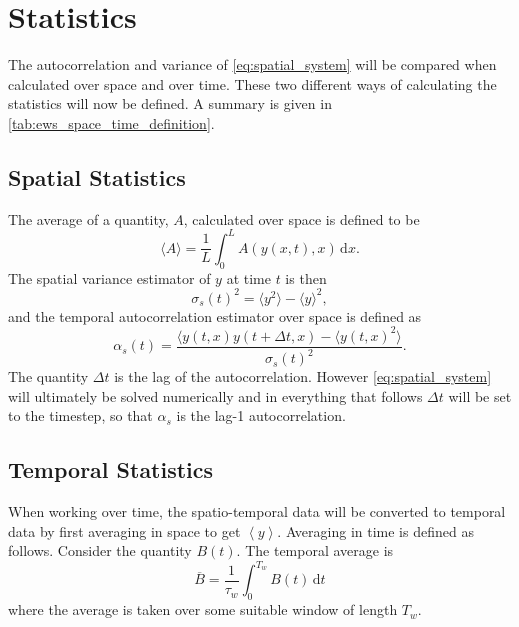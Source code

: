 \section{Statistics}
The autocorrelation and variance of \cref{eq:spatial_system} will be compared when calculated over space and over time. These two different ways of calculating the statistics  will now
be defined. A summary is given in \cref{tab:ews_space_time_definition}.

\subsection{Spatial Statistics}

The average of a quantity, $A$, calculated over space is defined to be
\begin{equation}
  \label{eq:definition_of_average}
  \langle A \rangle = \frac{1}{L}\int_0^L A(y(x,t),x) \,\mathrm{d}x.
\end{equation}
The spatial variance estimator of $y$ at time $t$ is then
\begin{equation}
  \label{eq:spatial_variance}
  \sigma_s(t)^2 = \langle y^2 \rangle - \langle y \rangle^2,
\end{equation}
and the temporal autocorrelation estimator over space is defined as
\begin{equation}
  \label{eq:spatial_autocorrelation}
  \alpha_s(t) = \frac{\langle y(t,x)y(t+\Delta t,x) - \langle y(t,x)^2 \rangle }{\sigma_s(t)^2}.
\end{equation}
The quantity $\Delta t$ is the lag of the autocorrelation. However \cref{eq:spatial_system} will ultimately be solved numerically and
in everything that follows $\Delta t$ will be set to the timestep, so that $\alpha_s$ is the lag-1 autocorrelation.

\subsection{Temporal Statistics}
When working over time, the spatio-temporal data will be converted to temporal data by first averaging in space to get $\left\langle y \right\rangle$.
Averaging in time is defined as follows. Consider the quantity $B(t)$. The temporal average is
\begin{equation}
  \label{eq:definition_of_temporal_average}
  \overline{B} = \frac{1}{\tau_w}\int_0^{T_w}B(t)\,\mathrm{d}t
\end{equation}
where the average is taken over some suitable window of length $T_w$.

